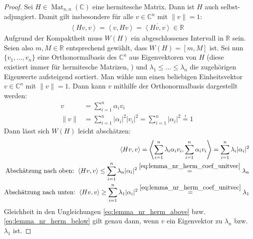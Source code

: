 \begin{lem} \label{lem:nr_herm}
\end{lem}
\begin{proof}
	Sei $H \in \operatorname{Mat}_{n,n}(\mathbb{C})$ eine hermitesche Matrix. Dann ist $H$ auch selbst-adjungiert. Damit gilt insbesondere für alle $v \in \mathbb{C}^n$ mit $\|v\|=1$: \begin{align}
		\left< Hv,v \right> = \left< v,Hv \right> = \overline{\left< Hv,v \right> } \in \mathbb{R}
	\end{align}
	Aufgrund der Kompaktheit muss $W(H)$ ein abgeschlossenes Intervall in $\mathbb{R}$ sein. Seien also $m, M \in \mathbb{R}$ entsprechend gewählt, dass $W(H)=[m,M]$ ist. Sei nun $\{v_1, ..., v_n\}$ eine Orthonormalbasis des $\mathbb{C}^n$ aus Eigenvektoren von $H$ (diese existiert immer für hermitesche Matrizen, \parencite[vgl.][Kapitel 5.4 - 5.6]{fischer2014lina}) und $\lambda_1\le...\le \lambda_n$ die zugehörigen Eigenwerte aufsteigend sortiert. Man wähle nun einen beliebigen Einheitsvektor $v \in \mathbb{C}^n$ mit $\|v\|=1$. Dann kann $v$ mithilfe der Orthonormalbasis dargestellt werden: \begin{align}
		v &= \sum_{i=1}^n {\alpha_i v_i} \\
		\|v\| &= \sum_{i=1}^n {|\alpha_i|^2 |v_i|^2} =\sum_{i=1}^n {|\alpha_i|^2} \overset{!}{=} 1  \label{eq:lemma_nr_herm_coef_unitvec}
	\end{align} 
	Dann lässt sich $W(H)$ leicht abschätzen: \begin{align}
		\left< Hv,v \right> = \left< \sum_{i=1}^n {\lambda_i \alpha_i v_i},\sum_{i=1}^n {\alpha_i v_i} \right> = \sum_{i=1}^n {\lambda_i |\alpha_i|^2}  \\
		\text{Abschätzung nach oben: } \left< Hv,v \right> \le \sum_{i=1}^n {\lambda_n |\alpha_i|^2} \overset{\ref{eq:lemma_nr_herm_coef_unitvec}}{=} \lambda_n \label{eq:lemma_nr_herm_above} \\
		\text{Abschätzung nach unten: } \left< Hv,v \right> \ge \sum_{i=1}^n {\lambda_1 |\alpha_i|^2} \overset{\ref{eq:lemma_nr_herm_coef_unitvec}}{=} \lambda_1 \label{eq:lemma_nr_herm_below}
	\end{align}
	Gleichheit in den Ungleichungen \ref{eq:lemma_nr_herm_above} bzw. \ref{eq:lemma_nr_herm_below} gilt genau dann, wenn $v$ ein Eigenvektor zu $\lambda_n$ bzw. $\lambda_1$ ist.
\end{proof}

